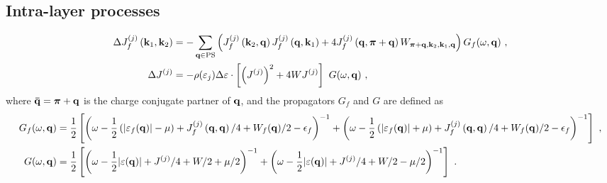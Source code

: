 \documentclass[%
reprint,
superscriptaddress,
groupedaddress,
superscriptaddress,
onecolumn,
]{revtex4-2}
\begin{document}
\subsection{Intra-layer processes}
\begin{equation}\begin{aligned}
	\Delta J_f^{(j)}\left({\bf k}_1, {\bf k}_2\right) &= -\sum_{{\bf q} \in \text{PS}} \left(J_f^{(j)}\left({\bf k}_2,{\bf q}\right) J_f^{(j)}\left({\bf q},{\bf k}_1\right) + 4J_f^{(j)}\left({\bf q}, {\boldsymbol \pi} + {\bf q}\right) W_{{\boldsymbol \pi} + {\bf q}, {\bf k}_2, {\bf k}_1, {\bf q}}\right) G_f(\omega, {\bf q})~,\\
	\Delta J^{(j)} &= - \rho(\varepsilon_j)\Delta \varepsilon\cdot\left[\left(J^{(j)}\right)^2 + 4WJ^{(j)}\right]~G(\omega, {\bf q})~,
\end{aligned}\end{equation}
where \({\bf \bar q} = {\boldsymbol \pi} + {\bf q}\) is the charge conjugate partner of \({\bf q}\), and the propagators \(G_f\) and \(G\) are defined as
\begin{equation}\begin{aligned}\label{propagators}
	G_f(\omega,{\bf q}) &= \frac{1}{2}\left[\left(\omega - \frac{1}{2}\left(|\varepsilon_f({\bf q})| - \mu\right) + J^{(j)}_f\left({\bf q},{\bf q}\right)/4 + W_f({\bf q})/2 - \epsilon_f\right)^{-1} + \left(\omega - \frac{1}{2}\left(|\varepsilon_f({\bf q})| + \mu\right) + J^{(j)}_f\left({\bf q},{\bf q}\right)/4 + W_f({\bf q})/2 - \epsilon_f\right)^{-1}\right] ~,\\
	G(\omega,{\bf q}) &= \frac{1}{2}\left[\left(\omega - \frac{1}{2}|\varepsilon({\bf q})| + J^{(j)}/4 + W/2 + \mu/2\right)^{-1} + \left(\omega - \frac{1}{2}|\varepsilon({\bf q})| + J^{(j)}/4 + W/2 - \mu/2\right)^{-1}\right] ~.
\end{aligned}\end{equation}
\end{document}
